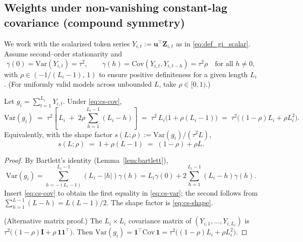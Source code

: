 

\subsection{Weights under non-vanishing constant-lag covariance (compound symmetry)}\label{subsec:cs}

We work with the scalarized token series $Y_{i,t}:=\bm{u}^\top\boldsymbol{Z}_{i,t}$ as in \eqref{eq:def_gi_scalar}. Assume second–order stationarity and
\begin{equation}
  \gamma(0)=\mathrm{Var}(Y_{i,t})=\tau^2,\qquad
  \gamma(h)=\mathrm{Cov}(Y_{i,t},Y_{i,t-h})=\tau^2\rho\quad\text{for all } h\neq 0,
  \label{eq:cs-cov}
\end{equation}
with $\rho\in(-1/(L_i-1),\,1)$ to ensure positive definiteness for a given length $L_i$. (For uniformly valid models across unbounded $L$, take $\rho\in[0,1)$.)

\begin{lemma}\label{lem:cs-var}
Let $g_i=\sum_{t=1}^{L_i} Y_{i,t}$. Under \eqref{eq:cs-cov},
\begin{equation}
  \mathrm{Var}(g_i)
  \;=\; \tau^2\!\left[\,L_i \;+\; 2\rho\!\sum_{h=1}^{L_i-1} (L_i-h)\right]
  \;=\; \tau^2\,L_i\Big(1+\rho(L_i-1)\Big)
  \;=\; \tau^2\Big((1-\rho)L_i + \rho L_i^2\Big).
  \label{eq:cs-var}
\end{equation}
Equivalently, with the shape factor $s(L;\rho):=\mathrm{Var}(g_i)/(\tau^2 L)$,
\begin{equation}
  s(L;\rho) \;=\; 1+\rho(L-1) \;=\; (1-\rho)+\rho L.
  \label{eq:cs-shape}
\end{equation}
\end{lemma}

\begin{proof}
By Bartlett’s identity (Lemma~\ref{lem:bartlett}),
\[
\mathrm{Var}(g_i)
=\sum_{h=-(L_i-1)}^{L_i-1}(L_i-|h|)\gamma(h)
= L_i\gamma(0)+2\sum_{h=1}^{L_i-1}(L_i-h)\gamma(h).
\]
Insert \eqref{eq:cs-cov} to obtain the first equality in \eqref{eq:cs-var}; the second follows from
$\sum_{h=1}^{L-1}(L-h)=L(L-1)/2$. The shape factor is \eqref{eq:cs-shape}.
\smallskip

(Alternative matrix proof.) The $L_i\times L_i$ covariance matrix of $(Y_{i,1},\dots,Y_{i,L_i})$ is
$\tau^2\!\big((1-\rho)\boldsymbol{I}+\rho\,\boldsymbol{1}\boldsymbol{1}^\top\big)$. Then
$\mathrm{Var}(g_i)=\boldsymbol{1}^\top \mathrm{Cov}\,\boldsymbol{1}
=\tau^2\big((1-\rho)L_i+\rho L_i^2\big)$.
\end{proof}

